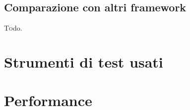 \subsection{Comparazione con altri framework\label{sec:flutter-comparazione}}
\lettrine[findent=1.5em]{T}odo.

\section{Strumenti di test usati}

\section{Performance}
